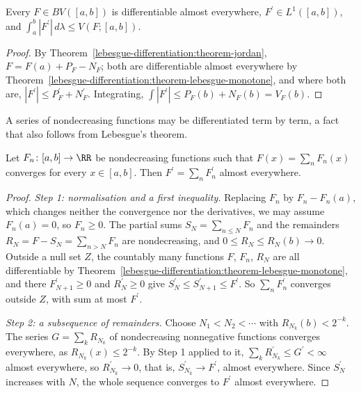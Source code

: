 \begin{corollary}\label{lebesgue-differentiation:corollary-bv-differentiable}
Every $F \in BV([a, b])$ is differentiable almost everywhere, $F^{\prime} \in L^1([a, b])$, and $\int_a^b|F^{\prime}|\,d\lambda \leq V(F; [a, b])$.
\end{corollary}

\begin{proof}
By Theorem~\ref{lebesgue-differentiation:theorem-jordan}, $F = F(a) + P_F - N_F$; both are differentiable almost everywhere by Theorem~\ref{lebesgue-differentiation:theorem-lebesgue-monotone}, and where both are,
$|F^{\prime}| \leq P_F^{\prime} + N_F^{\prime}$. Integrating, $\int|F^{\prime}| \leq P_F(b) + N_F(b) = V_F(b)$.
\end{proof}

A series of nondecreasing functions may be differentiated term by term, a fact that also follows from Lebesgue's theorem.

\begin{theorem}\label{lebesgue-differentiation:theorem-fubini-series}
Let $F_n \colon [a, b] \to \RR$ be nondecreasing functions such that $F(x) = \sum_nF_n(x)$ converges for every $x \in [a, b]$. Then $F^{\prime} = \sum_nF_n^{\prime}$ almost everywhere.
\end{theorem}

\begin{proof}
\emph{Step 1: normalisation and a first inequality.} Replacing $F_n$ by $F_n - F_n(a)$, which changes neither the convergence nor the derivatives, we may assume $F_n(a) = 0$, so $F_n \geq 0$. The partial
sums $S_N = \sum_{n \leq N}F_n$ and the remainders $R_N = F - S_N = \sum_{n > N}F_n$ are nondecreasing, and $0 \leq R_N \leq R_N(b) \to 0$. Outside a null set $Z$, the countably many functions $F$, $F_n$,
$R_N$ are all differentiable by Theorem~\ref{lebesgue-differentiation:theorem-lebesgue-monotone}, and there $F_{N+1}^{\prime} \geq 0$ and $R_N^{\prime} \geq 0$ give
$S_N^{\prime} \leq S_{N+1}^{\prime} \leq F^{\prime}$. So $\sum_nF_n^{\prime}$ converges outside $Z$, with sum at most $F^{\prime}$.

\emph{Step 2: a subsequence of remainders.} Choose $N_1 < N_2 < \cdots$ with $R_{N_k}(b) < 2^{-k}$. The series $G = \sum_kR_{N_k}$ of nondecreasing nonnegative functions converges everywhere, as
$R_{N_k}(x) \leq 2^{-k}$. By Step 1 applied to it, $\sum_kR_{N_k}^{\prime} \leq G^{\prime} < \infty$ almost everywhere, so $R_{N_k}^{\prime} \to 0$, that is, $S_{N_k}^{\prime} \to F^{\prime}$, almost
everywhere. Since $S_N^{\prime}$ increases with $N$, the whole sequence converges to $F^{\prime}$ almost everywhere.
\end{proof}

